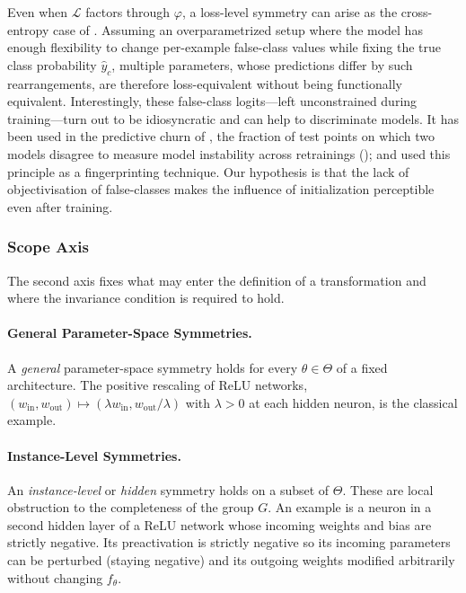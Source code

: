 \documentclass[mathematics,review,submit,moreauthors]{Definitions/mdpi}
\begin{document}
\begin{Remark}
    Even when $\mathcal{L}$ factors through $\varphi$, a loss-level symmetry can arise as the cross-entropy case of .
    Assuming an overparametrized setup where the model has enough flexibility to change per-example false-class values while fixing the true class probability $\hat y_c$, multiple parameters, whose predictions differ by such rearrangements, are therefore loss-equivalent without being functionally equivalent.
    Interestingly, these false-class logits---left unconstrained during training---turn out to be idiosyncratic and can help to discriminate models.
    It has been used in the predictive churn of \citet{zhuang2022pmls}, the fraction of test points on which two models disagree to measure model instability across retrainings (); and \citet{godinot2024} used this principle as a fingerprinting technique.
    Our hypothesis is that the lack of objectivisation of false-classes makes the influence of initialization perceptible even after training.
\end{Remark}

\subsubsection{Scope Axis}\label{sec:scope-param-space-symmetries}

The second axis fixes what may enter the definition of a transformation and where the invariance condition is required to hold.

\paragraph{General Parameter-Space Symmetries.}
A \emph{general} parameter-space symmetry holds for every $\theta\in\Theta$ of a fixed architecture.
The positive rescaling of ReLU networks, $(w_{\mathrm{in}}, w_{\mathrm{out}})\mapsto(\lambda w_{\mathrm{in}}, w_{\mathrm{out}}/\lambda)$ with $\lambda>0$ at each hidden neuron, is the classical example.

\paragraph{Instance-Level Symmetries.}
An \emph{instance-level} or \emph{hidden} \citep{grigsby2023p4icml} symmetry holds on a subset of $\Theta$.
These are local obstruction to the completeness of the group $G$.
An example is a neuron in a second hidden layer of a ReLU network whose incoming weights and bias are strictly negative.
Its preactivation is strictly negative so its incoming parameters can be perturbed (staying negative) and its outgoing weights modified arbitrarily without changing $f_\theta$.
\end{document}
